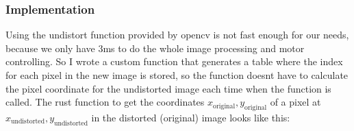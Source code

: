 \subsubsection{Implementation}\label{subsubsec:implementation}


Using the undistort function provided by opencv is not fast enough for our needs, because we only have 3ms to do the whole image processing and motor controlling.
So I wrote a custom function that generates a table where the index for each pixel in the new image is stored, so the function doesnt have to calculate the pixel coordinate for the undistorted image each time when the function is called.
The rust function to get the coordinates $x_{\text{original}},y_{\text{original}}$ of a pixel at $x_{\text{undistorted}},y_{\text{undistorted}}$ in the distorted (original) image looks like this:




